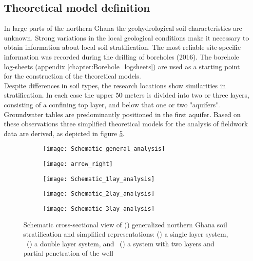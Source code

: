 \subsection{Theoretical model definition}
In large parts of the northern Ghana the geohydrological soil characteristics are unknown. Strong variations in the local geological conditions make it necessary to obtain information about local soil stratification. The most reliable site-specific information was recorded during the drilling of boreholes (2016). The borehole log-sheets (appendix \ref{chapter:Borehole_logsheets}) are used as a starting point for the construction of the theoretical models. 
\\

Despite differences in soil types, the research locations show similarities in stratification. In each case the upper 50 meters is divided into two or three layers, consisting of a confining top layer, and below that one or two "aquifers". Groundwater tables are predominantly positioned in the first aquifer. Based on these observations three simplified theoretical models for the analysis of fieldwork data are derived, as depicted in figure \ref{fig:schematic_fieldwork_analysis}. 

\begin{figure}[h!]
	\centering
	\begin{subfigure}[b]{0.21\linewidth}
		\centering\texttt{[image: Schematic\_general\_analysis]}
		\captionsetup{justification=centering}		
		\caption{\label{fig:Schematic_general_analysis}}
		\end{subfigure}%
	\begin{subfigure}[b]{0.12\linewidth}
		\centering\texttt{[image: arrow\_right]}
		\end{subfigure}%
	\begin{subfigure}[b]{0.21\linewidth}
		\centering\texttt{[image: Schematic\_1lay\_analysis]}
		\captionsetup{justification=centering}		
		\caption{\label{fig:Schematic_1lay_analysis}}
		\end{subfigure}%
	\begin{subfigure}[b]{0.21\linewidth}
        \centering\texttt{[image: Schematic\_2lay\_analysis]}
		\captionsetup{justification=centering}		
		\caption{\label{fig:Schematic_2lay_analysis}}
		\end{subfigure}
	\begin{subfigure}[b]{0.21\linewidth}
        \centering\texttt{[image: Schematic\_3lay\_analysis]}
		\captionsetup{justification=centering}		
		\caption{\label{fig:Schematic_3lay_analysis}}
		\end{subfigure}
	\captionsetup{justification=centering}	
	\caption{Schematic cross-sectional view of () generalized northern Ghana soil stratification and simplified representations: () a single layer system, ~() a double layer system, and ~() a system with two layers and partial penetration of the well} 
	\label{fig:schematic_fieldwork_analysis}
\end{figure} 

